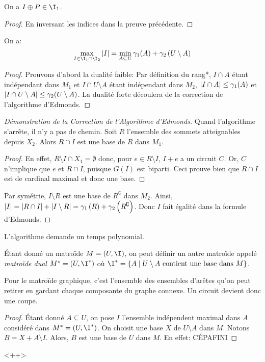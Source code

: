 \documentclass[math, info]{cours}
\begin{document}
\begin{lemme}
	On a $I \oplus P \in \I_{1}$.
\end{lemme}
\begin{proof}
	En inversant les indices dans la preuve précédente.
\end{proof}

\begin{thm}
	On a:
	\begin{equation*}
		\max_{I \in \I_{1} \cap \I_{2}} \abs{I} = \min_{A \subseteq U}\gamma_{1}(A) + \gamma_{2}\left(U\setminus A\right)
	\end{equation*}
\end{thm}
\begin{proof}
	Prouvons d'abord la dualité faible:
	Par définition du rang*, $I \cap A$ étant indépendant dans $M_{1}$ et $I\cap U\setminus A$ étant indépendant dans $M_{2}$, $\left|I\cap A\right| \leq \gamma_{1}(A)$ et $\left|I\cap U\setminus A\right| \leq \gamma_{2}(U\setminus A)$.
	La dualité forte découlera de la correction de l'algorithme d'Edmonds.
\end{proof}

\begin{proof}[Démonstration de la Correction de l'Algorithme d'Edmonds]
	Quand l'algorithme s'arrête, il n'y a pas de chemin.
	Soit $R$ l'ensemble des sommets atteignables depuis $X_{2}$.
	Alors $R \cap I$ est une base de $R$ dans $M_{1}$.
	\begin{proof}
	En effet, $R \setminus I \cap X_{1} = \emptyset$ donc, pour $e \in R\setminus I$, $I + e$ a un circuit $C$.
	Or, $C$ n'implique que $e$ et $R\cap I$, puisque $G(I)$ est biparti.
	Ceci prouve bien que $R\cap I$ est de cardinal maximal et donc une base.
	\end{proof}
	Par symétrie, $I\setminus R$ est une base de $R^{\complement}$ dans $M_{2}$.
	Ainsi, $\left|I\right| = \left|R \cap I\right| + \left|I\setminus R\right| = \gamma_{1}\left(R\right) + \gamma_{2}\left(R^{\complement}\right)$.
	Donc $I$ fait égalité dans la formule d'Edmonds.
\end{proof}

\begin{thm}
	L'algorithme demande un temps polynomial.
\end{thm}

\begin{definition}
	Étant donné un matroïde $M = \left(U, \I \right)$, on peut définir un autre matroïde appelé \emph{matroïde dual} $M^{*} = \left(U, \I^{*}\right)$ où $\I^{*} = \left\{A \mid U\setminus A \text{ contient une base dans } M \right\}$.
	\label{def:dualmatroid}
\end{definition}

Pour le matroïde graphique, c'est l'ensemble des ensembles d'arêtes qu'on peut retirer en gardant chaque composante du graphe connexe.
Un circuit devient donc une coupe.

\begin{proof}
	Étant donné $A \subseteq U$, on pose $I$ l'ensemble indépendent maximal dans $A$ considéré dans $M^{*} = \left(U, \I^{*}\right)$.
	On choisit une base $X$ de $U \setminus A$ dans $M$.
	Notons $B = X + A \setminus I$.
	Alors, $B$ est une base de $U$ dans $M$.
	En effet: CÉPAFINI
\end{proof}<++>
\end{document}
